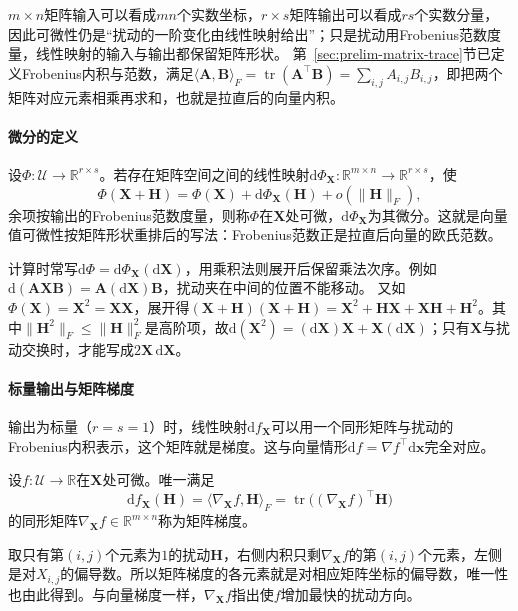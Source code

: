 $m\times n$矩阵输入可以看成$mn$个实数坐标，$r\times s$矩阵输出可以看成$rs$个实数分量，因此可微性仍是“扰动的一阶变化由线性映射给出”；只是扰动用Frobenius范数度量，线性映射的输入与输出都保留矩阵形状。
第~\ref{sec:prelim-matrix-trace}节已定义Frobenius内积与范数，满足$\langle\bm A,\bm B\rangle_F=\operatorname{tr}(\bm A^\top\bm B)=\sum_{i,j}A_{i,j}B_{i,j}$，即把两个矩阵对应元素相乘再求和，也就是拉直后的向量内积。

\paragraph{微分的定义}
设$\Phi:\mathcal U\to\mathbb R^{r\times s}$。若存在矩阵空间之间的线性映射$\mathrm d\Phi_{\bm X}:\mathbb R^{m\times n}\to\mathbb R^{r\times s}$，使
\[
 \Phi(\bm X+\bm H)=\Phi(\bm X)+\mathrm d\Phi_{\bm X}(\bm H)+o(\lVert\bm H\rVert_F),
\]
余项按输出的Frobenius范数度量，则称$\Phi$在$\bm X$处可微，$\mathrm d\Phi_{\bm X}$为其微分。这就是向量值可微性按矩阵形状重排后的写法：Frobenius范数正是拉直后向量的欧氏范数。

计算时常写$\mathrm d\Phi=\mathrm d\Phi_{\bm X}(\mathrm d\bm X)$，用乘积法则展开后保留乘法次序。例如$\mathrm d(\bm A\bm X\bm B)=\bm A(\mathrm d\bm X)\bm B$，扰动夹在中间的位置不能移动。
又如$\Phi(\bm X)=\bm X^2=\bm X\bm X$，展开得$(\bm X+\bm H)(\bm X+\bm H)=\bm X^2+\bm H\bm X+\bm X\bm H+\bm H^2$。其中$\lVert\bm H^2\rVert_F\leq\lVert\bm H\rVert_F^2$是高阶项，故$\mathrm d(\bm X^2)=(\mathrm d\bm X)\bm X+\bm X(\mathrm d\bm X)$；只有$\bm X$与扰动交换时，才能写成$2\bm X\,\mathrm d\bm X$。

\paragraph{标量输出与矩阵梯度}
输出为标量（$r=s=1$）时，线性映射$\mathrm df_{\bm X}$可以用一个同形矩阵与扰动的Frobenius内积表示，这个矩阵就是梯度。这与向量情形$\mathrm df=\nabla f^\top\mathrm d\bm x$完全对应。
\begin{definition}[矩阵标量函数的梯度]
\label{def:multivariable-matrix-scalar-gradient}
设$f:\mathcal U\to\mathbb R$在$\bm X$处可微。唯一满足
\begin{equation}
 \mathrm df_{\bm X}(\bm H)=\langle\nabla_{\bm X}f,\bm H\rangle_F
 =\operatorname{tr}\bigl((\nabla_{\bm X}f)^\top\bm H\bigr)
\label{eq:analysis-matrix-gradient-definition}
\end{equation}
的同形矩阵$\nabla_{\bm X}f\in\mathbb R^{m\times n}$称为矩阵梯度。
\end{definition}
取只有第$(i,j)$个元素为$1$的扰动$\bm H$，右侧内积只剩$\nabla_{\bm X}f$的第$(i,j)$个元素，左侧是对$X_{i,j}$的偏导数。所以矩阵梯度的各元素就是对相应矩阵坐标的偏导数，唯一性也由此得到。与向量梯度一样，$\nabla_{\bm X}f$指出使$f$增加最快的扰动方向。

